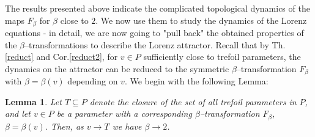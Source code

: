 \documentclass[10pt,reqno]{amsart}
\theoremstyle{plain}
\theoremstyle{assumption}
\theoremstyle{notation}
\theoremstyle{claim}
\theoremstyle{conj}
\theoremstyle{theorem}
\theoremstyle{proposition}
\theoremstyle{corollary}
\newtheorem{lemma}{Lemma}[section]
\begin{document}
The results presented above indicate the complicated topological dynamics of the maps $F_{\beta}$ for $\beta$ close to $2$. We now use them to study the dynamics of the Lorenz equations - in detail, we are now going to "pull back" the obtained properties of the $\beta$--transformations to describe the Lorenz attractor. Recall that by Th.\ref{reduct} and Cor.\ref{reduct2}, for $v\in P$ sufficiently close to trefoil parameters, the dynamics on the attractor can be reduced to the symmetric $\beta$--transformation $F_{\beta}$ with $\beta=\beta(v)$ depending on $v$. We begin with the following Lemma:
\begin{lemma}
    \label{betato2} Let $T\subseteq P$ denote the closure of the set of all trefoil parameters in $P$, and let $v\in P$ be a parameter with a corresponding $\beta$--transformation $F_{\beta}$, $\beta=\beta(v)$. Then, as $v\to T$ we have $\beta\to2$.
\end{lemma}
\end{document}
